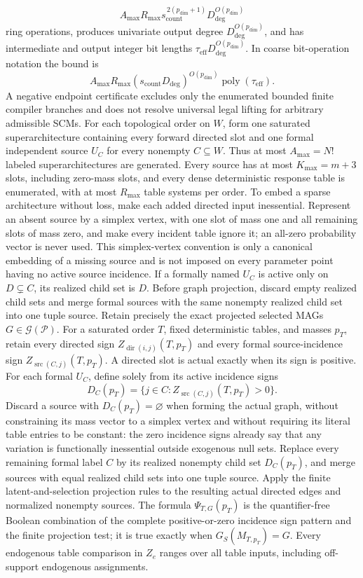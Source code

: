\[
A_{\max}R_{\max}s_{\mathrm{count}}^{\,2(p_{\mathrm{dim}}+1)}D_{\mathrm{deg}}^{O(p_{\mathrm{dim}})}
\]
ring operations, produces univariate output degree \(D_{\mathrm{deg}}^{O(p_{\mathrm{dim}})}\), and has intermediate and output integer bit lengths \(\tau_{\mathrm{eff}}D_{\mathrm{deg}}^{O(p_{\mathrm{dim}})}\).  In coarse bit-operation notation the bound is
\[
A_{\max}R_{\max}(s_{\mathrm{count}}D_{\mathrm{deg}})^{O(p_{\mathrm{dim}})}\operatorname{poly}(\tau_{\mathrm{eff}}).
\]
A negative endpoint certificate excludes only the enumerated bounded finite compiler branches and does not resolve universal legal lifting for arbitrary admissible SCMs.
For each topological order on \(W\), form one saturated superarchitecture containing every forward directed slot and one formal independent source \(U_C\) for every nonempty \(C\subseteq W\).  Thus at most \(A_{\max}=N!\) labeled superarchitectures are generated.  Every source has at most \(K_{\max}=m+3\) slots, including zero-mass slots, and every dense deterministic response table is enumerated, with at most \(R_{\max}\) table systems per order.  To embed a sparse architecture without loss, make each added directed input inessential.  Represent an absent source by a simplex vertex, with one slot of mass one and all remaining slots of mass zero, and make every incident table ignore it; an all-zero probability vector is never used.  This simplex-vertex convention is only a canonical embedding of a missing source and is not imposed on every parameter point having no active source incidence.  If a formally named \(U_C\) is active only on \(D\subsetneq C\), its realized child set is \(D\).  Before graph projection, discard empty realized child sets and merge formal sources with the same nonempty realized child set into one tuple source.  Retain precisely the exact projected selected MAGs \(G\in\mathcal G(\mathcal P)\).
For a saturated order \(T\), fixed deterministic tables, and masses \(p_T\), retain every directed sign \(Z_{\operatorname{dir}(i,j)}(T,p_T)\) and every formal source-incidence sign \(Z_{\operatorname{src}(C,j)}(T,p_T)\).  A directed slot is actual exactly when its sign is positive.  For each formal \(U_C\), define solely from its active incidence signs
\[
D_C(p_T)=\{j\in C:Z_{\operatorname{src}(C,j)}(T,p_T)>0\}.
\]
Discard a source with \(D_C(p_T)=\varnothing\) when forming the actual graph, without constraining its mass vector to a simplex vertex and without requiring its literal table entries to be constant: the zero incidence signs already say that any variation is functionally inessential outside exogenous null sets.  Replace every remaining formal label \(C\) by its realized nonempty child set \(D_C(p_T)\), and merge sources with equal realized child sets into one tuple source.  Apply the finite latent-and-selection projection rules to the resulting actual directed edges and normalized nonempty sources.  The formula \(\Psi_{T,G}(p_T)\) is the quantifier-free Boolean combination of the complete positive-or-zero incidence sign pattern and the finite projection test; it is true exactly when \(G_S(M_{T,p_T})=G\).  Every endogenous table comparison in \(Z_e\) ranges over all table inputs, including off-support endogenous assignments.
